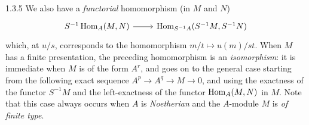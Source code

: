 \documentclass[../main.tex]{subfiles}
\begin{document}
\begin{env}{1.3.5}
We also have a \emph{functorial} homomorphism (in $M$ and $N$)
\[
  \begin{tikzcd}
    S^{-1}\Hom_A(M,N)\ar[r] & \Hom_{S^{-1}A}(S^{-1}M,S^{-1}N)
  \end{tikzcd}
\]
which, at $u/s$, corresponds to the homomorphism $m/t\mapsto u(m)/st$. When $M$ has a finite presentation, the
preceding homomorphism is an \emph{isomorphism}: it is immediate when $M$ is of the form $A^r$, and goes on to the general
case starting from the following exact sequence $A^p\to A^q\to M\to 0$, and using the exactness of the functor $S^{-1}M$ and
the left-exactness of the functor $\operatorname{Hom}_A(M,N)$ in $M$. Note that this case always occurs when $A$ is \emph{Noetherian} and the
$A$-module $M$ is \emph{of finite type}.
\end{env}
\end{document}

